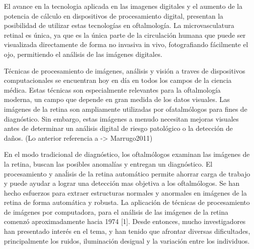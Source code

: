 El avance en la tecnologia aplicada en las imagenes digitales y  el aumento de la potencia de c\'alculo en dispositivos de procesamiento digital, presentan la posibilidad de utilizar estas tecnolog\'ias en oftalmolog\'ia. La microvasculatura retinal es \'unica, ya que es la \'unica parte de la circulaci\'on humana que puede ser visualizada directamente de forma no invasiva in vivo, fotografiando f\'acilmente el ojo, permitiendo el an\'alisis de las im\'agenes digitales. \cite{patton2006retinal}


T\'ecnicas de procesamiento de imágenes, análisis y visión a traves de dispositivos computacionales se encuentran hoy en d\'ia en todos los campos de la ciencia m\'edica. Estas técnicas son especialmente relevantes para la oftalmología moderna, un campo que depende en gran medida de los datos visuales. Las im\'agenes de la retina son ampliamente utilizadas por ofatalm\'ologos para fines de diagn\'ostico. Sin embargo, estas im\'agenes a menudo necesitan mejoras visuales antes de determinar un an\'alisis digital de riesgo patol\'ogico o la detecci\'on de da\~nos. 
(Lo anterior referencia a -> Marrugo2011)

En el modo tradicional de diagn\'ostico, los oftalm\'ologos examinan las im\'agenes de la retina, buscan las posibles anomal\'ias y entregan un diagn\'ostico. El procesamiento y ana\'lisis de la retina autom\'atico permite ahorrar carga de trabajo y puede ayudar a lograr una detecci\'on mas objetiva a los oftalm\'ologos. Se han hecho esfuerzos para extraer estructuras normales y anormales en im\'agenes de la retina de forma autom\'atica y robusta. La aplicaci\'on de t\'ecnicas de procesamiento de im\'agenes por computadora, para el an\'alisis de las im\'agenes de la retina comenz\'o aproximadamente hacia 1974 [1]. Desde entonces, mucho investigadores han presentado inter\'es en el tema, y han tenido que afrontar diversas dificultades, principalmente los ruidos, iluminaci\'on desigual y la variaci\'on entre los individuos. \cite{li2004automated}


